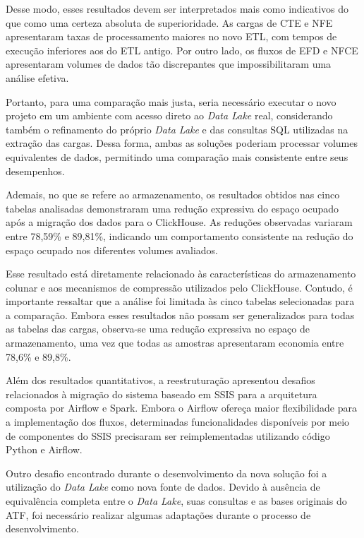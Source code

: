 Desse modo, esses resultados devem ser interpretados mais como indicativos do que como uma
certeza absoluta de superioridade. As cargas de CTE e NFE apresentaram taxas de processamento
maiores no novo ETL, com tempos de execução inferiores aos do ETL antigo. Por outro lado, os
fluxos de EFD e NFCE apresentaram volumes de dados tão discrepantes que impossibilitaram uma
análise efetiva.

Portanto, para uma comparação mais justa, seria necessário executar o novo projeto em um 
ambiente com acesso direto ao \textit{Data Lake} real, considerando também o refinamento do próprio 
\textit{Data Lake} e das consultas SQL utilizadas na extração das cargas. Dessa forma, ambas as soluções 
poderiam processar volumes equivalentes de dados, permitindo uma comparação mais consistente 
entre seus desempenhos.

Ademais, no que se refere ao armazenamento, os resultados obtidos nas cinco tabelas analisadas 
demonstraram uma redução expressiva do espaço ocupado após a migração dos dados para o ClickHouse.
As reduções observadas variaram entre 78,59\% e 89,81\%, indicando um comportamento consistente 
na redução do espaço ocupado nos diferentes volumes avaliados.

Esse resultado está diretamente relacionado às características do armazenamento colunar e aos 
mecanismos de compressão utilizados pelo ClickHouse. Contudo, é importante ressaltar que a 
análise foi limitada às cinco tabelas selecionadas para a comparação. Embora esses resultados 
não possam ser generalizados para todas as tabelas das cargas, observa-se uma redução expressiva 
no espaço de armazenamento, uma vez que todas as amostras apresentaram economia entre 78,6\% e 89,8\%.

Além dos resultados quantitativos, a reestruturação apresentou desafios relacionados
à migração do sistema baseado em SSIS para a arquitetura composta por Airflow e Spark.
Embora o Airflow ofereça maior flexibilidade para a implementação dos fluxos,
determinadas funcionalidades disponíveis por meio de componentes do SSIS precisaram ser
reimplementadas utilizando código Python e Airflow. 

Outro desafio encontrado durante o desenvolvimento da nova solução foi a utilização do 
\textit{Data Lake} como nova fonte de dados. Devido à ausência de equivalência completa 
entre o \textit{Data Lake}, suas consultas e as bases originais do ATF, foi necessário 
realizar algumas adaptações durante o processo de desenvolvimento. 

